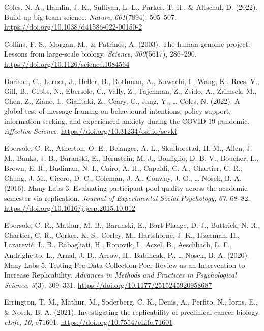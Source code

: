 \documentclass[
  man]{apa7}
\newlength{\cslhangindent}
\newlength{\cslentryspacingunit} %
\newenvironment{CSLReferences}[2] %
 {%
  \setlength{\parindent}{0pt}
  \ifodd #1
  \let\oldpar\par
  \def\par{\hangindent=\cslhangindent\oldpar}
  \fi
  \setlength{\parskip}{#2\cslentryspacingunit}
 }%
 {}
\begin{document}
\begin{CSLReferences}{1}{0}
\leavevmode{}%
Coles, N. A., Hamlin, J. K., Sullivan, L. L., Parker, T. H., \& Altschul, D. (2022). Build up big-team science. \emph{Nature}, \emph{601}(7894), 505--507. \url{https://doi.org/10.1038/d41586-022-00150-2}

\leavevmode{}%
Collins, F. S., Morgan, M., \& Patrinos, A. (2003). The human genome project: Lessons from large-scale biology. \emph{Science}, \emph{300}(5617), 286--290. \url{https://doi.org/10.1126/science.1084564}

\leavevmode{}%
Dorison, C., Lerner, J., Heller, B., Rothman, A., Kawachi, I., Wang, K., Rees, V., Gill, B., Gibbs, N., Ebersole, C., Vally, Z., Tajchman, Z., Zsido, A., Zrimsek, M., Chen, Z., Ziano, I., Gialitaki, Z., Ceary, C., Jang, Y., \ldots{} Coles, N. (2022). A global test of message framing on behavioural intentions, policy support, information seeking, and experienced anxiety during the COVID-19 pandemic. \emph{Affective Science}. \url{https://doi.org/10.31234/osf.io/sevkf}

\leavevmode{}%
Ebersole, C. R., Atherton, O. E., Belanger, A. L., Skulborstad, H. M., Allen, J. M., Banks, J. B., Baranski, E., Bernstein, M. J., Bonfiglio, D. B. V., Boucher, L., Brown, E. R., Budiman, N. I., Cairo, A. H., Capaldi, C. A., Chartier, C. R., Chung, J. M., Cicero, D. C., Coleman, J. A., Conway, J. G., \ldots{} Nosek, B. A. (2016). Many Labs 3: Evaluating participant pool quality across the academic semester via replication. \emph{Journal of Experimental Social Psychology}, \emph{67}, 68--82. \url{https://doi.org/10.1016/j.jesp.2015.10.012}

\leavevmode{}%
Ebersole, C. R., Mathur, M. B., Baranski, E., Bart-Plange, D.-J., Buttrick, N. R., Chartier, C. R., Corker, K. S., Corley, M., Hartshorne, J. K., IJzerman, H., Lazarević, L. B., Rabagliati, H., Ropovik, I., Aczel, B., Aeschbach, L. F., Andrighetto, L., Arnal, J. D., Arrow, H., Babincak, P., \ldots{} Nosek, B. A. (2020). Many Labs 5: Testing Pre-Data-Collection Peer Review as an Intervention to Increase Replicability. \emph{Advances in Methods and Practices in Psychological Science}, \emph{3}(3), 309--331. \url{https://doi.org/10.1177/2515245920958687}

\leavevmode{}%
Errington, T. M., Mathur, M., Soderberg, C. K., Denis, A., Perfito, N., Iorns, E., \& Nosek, B. A. (2021). Investigating the replicability of preclinical cancer biology. \emph{eLife}, \emph{10}, e71601. \url{https://doi.org/10.7554/eLife.71601}


\end{CSLReferences}
\end{document}
